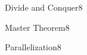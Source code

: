 \documentclass[a4paper]{article}
\begin{document}
\header

\begin{problem}{Divide and Conquer}{8}
\end{problem}

\begin{problem}{Master Theorem}{8}
\end{problem}


\begin{problem}{Parallelization}{8}
\end{problem}
\end{document}

